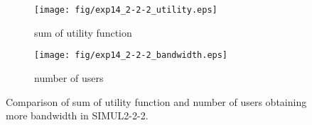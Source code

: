 \begin{figure}
	\begin{center}
		\begin{subfigure}[b]{0.8\textwidth}
			\centering
			\texttt{[image: fig/exp14\_2-2-2\_utility.eps]}
			\caption{sum of utility function}
			\label{figure:simul2_2_2_u_a}
		\end{subfigure}
		\begin{subfigure}[b]{0.8\textwidth}
			\centering
			\texttt{[image: fig/exp14\_2-2-2\_bandwidth.eps]}
			\caption{number of users}
			\label{figure:simul2_2_2_u_b}
		\end{subfigure}
		\caption{Comparison of sum of utility function and number of users obtaining more bandwidth in SIMUL2-2-2.}
		\label{figure:simul2_2_2_u}
	\end{center}
\end{figure}

\clearpage

